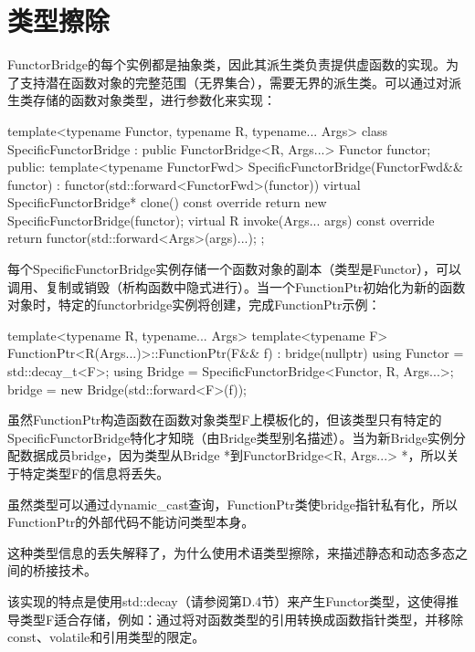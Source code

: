 \section{类型擦除}
FunctorBridge的每个实例都是抽象类，因此其派生类负责提供虚函数的实现。为了支持潜在函数对象的完整范围（无界集合），需要无界的派生类。可以通过对派生类存储的函数对象类型，进行参数化来实现：

\begin{cpp}
template<typename Functor, typename R, typename... Args>
class SpecificFunctorBridge : public FunctorBridge<R, Args...> {
	Functor functor;
	public:
	template<typename FunctorFwd>
	SpecificFunctorBridge(FunctorFwd&& functor)
	: functor(std::forward<FunctorFwd>(functor)) {
	}
	virtual SpecificFunctorBridge* clone() const override {
		return new SpecificFunctorBridge(functor);
	}
	virtual R invoke(Args... args) const override {
		return functor(std::forward<Args>(args)...);
	}
};
\end{cpp}

每个SpecificFunctorBridge实例存储一个函数对象的副本（类型是Functor），可以调用、复制或销毁（析构函数中隐式进行）。当一个FunctionPtr初始化为新的函数对象时，特定的functorbridge实例将创建，完成FunctionPtr示例：

\begin{cpp}
template<typename R, typename... Args>
template<typename F>
FunctionPtr<R(Args...)>::FunctionPtr(F&& f)
: bridge(nullptr) {
	using Functor = std::decay_t<F>;
	using Bridge = SpecificFunctorBridge<Functor, R, Args...>;
	bridge = new Bridge(std::forward<F>(f));
}
\end{cpp}

虽然FunctionPtr构造函数在函数对象类型F上模板化的，但该类型只有特定的SpecificFunctorBridge特化才知晓（由Bridge类型别名描述）。当为新Bridge实例分配数据成员bridge，因为类型从Bridge *到FunctorBridge<R, Args...> *，所以关于特定类型F的信息将丢失。

\begin{notice}
虽然类型可以通过dynamic\_cast查询，FunctionPtr类使bridge指针私有化，所以FunctionPtr的外部代码不能访问类型本身。
\end{notice}

这种类型信息的丢失解释了，为什么使用术语类型擦除，来描述静态和动态多态之间的桥接技术。

该实现的特点是使用std::decay（请参阅第D.4节）来产生Functor类型，这使得推导类型F适合存储，例如：通过将对函数类型的引用转换成函数指针类型，并移除const、volatile和引用类型的限定。







































